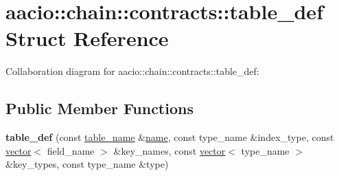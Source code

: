 \hypertarget{structaacio_1_1chain_1_1contracts_1_1table__def}{}\section{aacio\+:\+:chain\+:\+:contracts\+:\+:table\+\_\+def Struct Reference}
\label{structaacio_1_1chain_1_1contracts_1_1table__def}


Collaboration diagram for aacio\+:\+:chain\+:\+:contracts\+:\+:table\+\_\+def\+:
\subsection*{Public Member Functions}
\begin{DoxyCompactItemize}
\item 
\mbox{\label{structaacio_1_1chain_1_1contracts_1_1table__def_a2e2bcf71d0dbcd6bff0243f90b14e8e0}} 
{\bfseries table\+\_\+def} (const \mbox{\hyperlink{structaacio_1_1chain_1_1name}{table\+\_\+name}} \&\mbox{\hyperlink{structaacio_1_1chain_1_1name}{name}}, const type\+\_\+name \&index\+\_\+type, const \mbox{\hyperlink{classstd_1_1vector}{vector}}$<$ field\+\_\+name $>$ \&key\+\_\+names, const \mbox{\hyperlink{classstd_1_1vector}{vector}}$<$ type\+\_\+name $>$ \&key\+\_\+types, const type\+\_\+name \&type)
\end{DoxyCompactItemize}
